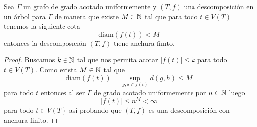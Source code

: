 \documentclass[tesis.tex]{subfiles}
\begin{document}
\begin{lema}\label{lema_tw_diam_anchura}
	Sea $\Gamma$ un grafo de grado acotado uniformemente y 
	$(T,f)$ una descomposición en un árbol para $\Gamma$ de manera que existe $M \in \mathbb{N}$ tal que para todo $t \in V(T)$ tenemos la siguiente cota
	\[
		\text{diam}( f(t)) < M
	\]   
	entonces la descomposición $(T,f)$ tiene anchura finito.
\end{lema}
\begin{proof}
	Buscamos $k \in \mathbb{N}$ tal que nos permita acotar $|f(t)| \le k$ para todo $t \in V(T)$. 
	Como exista $M \in \mathbb{N}$ tal que 
	\[
	\text{diam}(f(t)) =  \sup_{g,h \in f(t)} d(g,h) \le M
	\] 
	para todo $t$ 
	entonces al ser $\Gamma$ de grado acotado uniformemente por $n \in \mathbb{N}$ luego 
	\[
		|f(t)| \le n^{M} < \infty
	\]
	para todo $t \in V(T)$ así probando que $(T,f)$ es una descomposición con anchura finito.
\end{proof}
\end{document}
